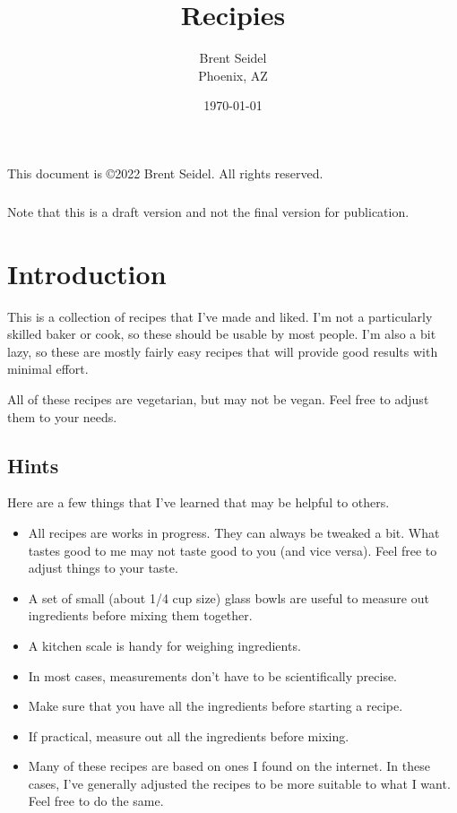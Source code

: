 \documentclass[10pt, openany]{book}
\title{Recipies}
\author{Brent Seidel \\ Phoenix, AZ}
\date{ \today }
\begin{document}
%
%
\frontmatter
\maketitle
\begin{center}
This document is \copyright 2022 Brent Seidel.  All rights reserved.

\paragraph{}Note that this is a draft version and not the final version for publication.
\end{center}
\tableofcontents

\mainmatter

\chapter{Introduction}
This is a collection of recipes that I've made and liked.  I'm not a particularly skilled baker or cook, so these should be usable by most people.  I'm also a bit lazy, so these are mostly fairly easy recipes that will provide good results with minimal effort.

All of these recipes are vegetarian, but may not be vegan.  Feel free to adjust them to your needs.

\section{Hints}
Here are a few things that I've learned that may be helpful to others.
\begin{itemize}
  \item All recipes are works in progress.  They can always be tweaked a bit.  What tastes good to me may not taste good to you (and vice versa).  Feel free to adjust things to your taste.
  \item A set of small (about 1/4 cup size) glass bowls are useful to measure out ingredients before mixing them together.
  \item A kitchen scale is handy for weighing ingredients.
  \item In most cases, measurements don't have to be scientifically precise.
  \item Make sure that you have all the ingredients before starting a recipe.
  \item If practical, measure out all the ingredients before mixing.
  \item Many of these recipes are based on ones I found on the internet.  In these cases, I've generally adjusted the recipes to be more suitable to what I want.  Feel free to do the same.
\end{itemize}
\end{document}
